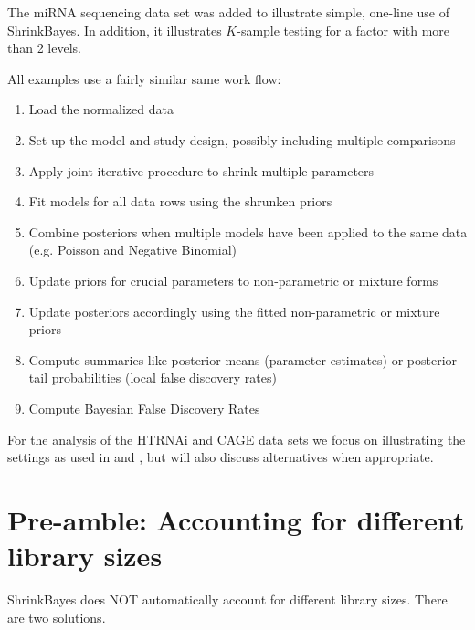 \documentclass[11pt]{article}
\newcommand{\para}{\bigskip\noindent}
\begin{document}
\para
The miRNA sequencing data set was added to illustrate simple, one-line use of ShrinkBayes. In addition,
it illustrates $K$-sample testing for a factor with more than 2 levels.

\para
All examples use a fairly similar same work flow:
\begin{enumerate}
\item Load the normalized data
\item Set up the model and study design, possibly including multiple comparisons
\item Apply joint iterative procedure to shrink multiple parameters
\item Fit models for all data rows using the shrunken priors
\item Combine posteriors when multiple models have been applied to the same data (e.g. Poisson and Negative Binomial)
\item Update priors for crucial parameters to non-parametric or mixture forms
\item Update posteriors accordingly using the fitted non-parametric or mixture priors
\item Compute summaries like posterior means (parameter estimates) or posterior tail probabilities (local false discovery rates)
\item Compute Bayesian False Discovery Rates
\end{enumerate}

For the analysis of the HTRNAi and CAGE data sets we focus on illustrating the settings as used in \citep[HT RNAi data]{WielHTRNAi} and
\citep[CAGE data]{WielShrinkSeq}, but will also discuss alternatives when appropriate.

\section{Pre-amble: Accounting for different library sizes}\label{offset}
ShrinkBayes does NOT automatically account for different library sizes. There are two solutions. 
\end{document}

